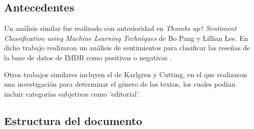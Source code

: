 \documentclass[hidelinks]{sig-alternate-05-2015}
\begin{document}
\subsection{Antecedentes}

Un análisis similar fue realizado con anterioridad en \textit{Thumbs up? Sentiment Classification using Machine Learning Techniques} de Bo Pang y Lillian Lee. En dicho trabajo realizaron un análisis de sentimientos para clasificar las reseñas de la base de datos de IMDB como positivas o negativas \cite{pang:thumbs up}.

Otros trabajos similares incluyen el de Karlgren y Cutting, en el que realizaron una investigación para determinar el género de los textos, los cuales podían incluir categorías subjetivas como 'editorial'.\cite{karlgren: text genres}

\subsection{Estructura del documento}
\end{document}
